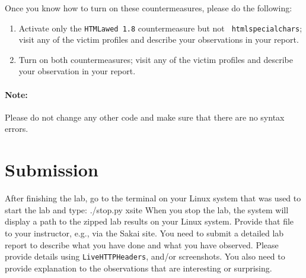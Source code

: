 Once you know how to turn on these countermeasures, please do the
following:
\begin{enumerate}

\item Activate only the {\tt HTMLawed 1.8} countermeasure but not {\tt
htmlspecialchars}; visit any of the victim profiles and describe your
observations in your report. 

\item Turn on both countermeasures; visit any of the victim profiles and 
describe your observation in your report. 



\end{enumerate}


\paragraph{Note:} Please do not change any other code and make sure that there are no syntax
errors.




\section{Submission}
After finishing the lab, go to the terminal on your Linux system that was used to start the lab and type:	
./stop.py xsite
When you stop the lab, the system will display a path to the zipped lab results on your Linux system.  Provide that file to 
your instructor, e.g., via the Sakai site.
You need to submit a detailed lab report to describe what you have
done and what you have observed. Please provide details using  
{\tt LiveHTTPHeaders},  and/or screenshots.
You also need to provide explanation
to the observations that are interesting or surprising.





